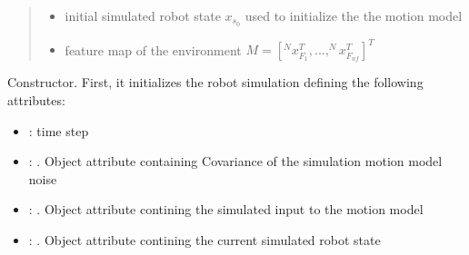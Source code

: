 \documentclass[letterpaper,10pt,english]{sphinxmanual}
\begin{document}
\begin{fulllineitems}

\begin{fulllineitems}
\label{\detokenize{robot_simulation:SimulatedRobot.SimulatedRobot.__init__}}
\pysigstartsignatures
{}
\pysigstopsignatures\begin{quote}\begin{description}
\begin{itemize}
\item {} 
\sphinxAtStartPar
{} \textendash{} initial simulated robot state \(x_{s_0}\) used to initialize the the motion model

\item {} 
\sphinxAtStartPar
{} \textendash{} feature map of the environment \(M=[^Nx_{F_1}^T,...,^Nx_{F_{nf}}^T]^T\)

\end{itemize}

\end{description}\end{quote}

\sphinxAtStartPar
Constructor. First, it initializes the robot simulation defining the following attributes:
\begin{itemize}
\item {} 
\sphinxAtStartPar
{} : time step

\item {} 
\sphinxAtStartPar
{} : . Object attribute containing Covariance of the simulation motion model noise

\item {} 
\sphinxAtStartPar
{} : . Object attribute contining the simulated input to the motion model

\item {} 
\sphinxAtStartPar
{} : . Object attribute contining the current simulated robot state


\end{itemize}
\end{fulllineitems}
\end{fulllineitems}
\end{document}

